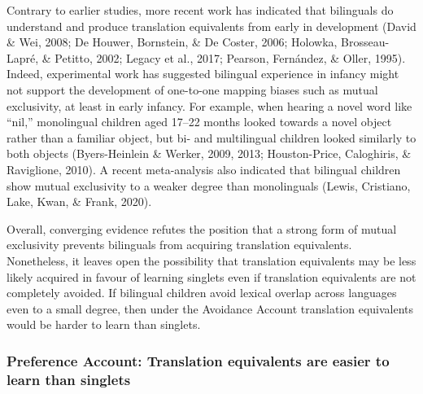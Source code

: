 \documentclass[
  english,
  ,man,floatsintext]{apa6}
\begin{document}
Contrary to earlier studies, more recent work has indicated that bilinguals do understand and produce translation equivalents from early in development (David \& Wei, 2008; De Houwer, Bornstein, \& De Coster, 2006; Holowka, Brosseau-Lapré, \& Petitto, 2002; Legacy et al., 2017; Pearson, Fernández, \& Oller, 1995). Indeed, experimental work has suggested bilingual experience in infancy might not support the development of one-to-one mapping biases such as mutual exclusivity, at least in early infancy. For example, when hearing a novel word like ``nil,'' monolingual children aged 17--22 months looked towards a novel object rather than a familiar object, but bi- and multilingual children looked similarly to both objects (Byers-Heinlein \& Werker, 2009, 2013; Houston-Price, Caloghiris, \& Raviglione, 2010). A recent meta-analysis also indicated that bilingual children show mutual exclusivity to a weaker degree than monolinguals (Lewis, Cristiano, Lake, Kwan, \& Frank, 2020).

Overall, converging evidence refutes the position that a strong form of mutual exclusivity prevents bilinguals from acquiring translation equivalents. Nonetheless, it leaves open the possibility that translation equivalents may be less likely acquired in favour of learning singlets even if translation equivalents are not completely avoided. If bilingual children avoid lexical overlap across languages even to a small degree, then under the Avoidance Account translation equivalents would be harder to learn than singlets.

\hypertarget{preference-account-translation-equivalents-are-easier-to-learn-than-singlets}{%
\subsubsection{Preference Account: Translation equivalents are easier to learn than singlets}\label{preference-account-translation-equivalents-are-easier-to-learn-than-singlets}}
\end{document}
